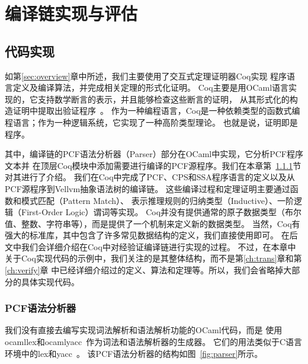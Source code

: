 
\chapter{编译链实现与评估} \label{ch:implement}

\setcounter{lstlisting}{1}
\section{代码实现}

如第\ref{sec:overview}章中所述，我们主要使用了交互式定理证明器Coq实现
程序语言定义及编译算法，并完成相关定理的形式化证明。
Coq主要是用OCaml语言实现的，它支持数学断言的表示，并且能够检查这些断言的证明，
从其形式化的构造证明中提取出验证程序~\cite{paulin2011introduction,chlipala2022certified}。
作为一种编程语言，Coq是一种依赖类型的函数式编程语言；作为一种逻辑系统，它实现了一种高阶类型理论。
也就是说，证明即是程序。

其中，编译链的PCF语法分析器（Parser）部分在OCaml中实现，它分析PCF程序文本并
在顶层Coq模块中添加需要进行编译的PCF源程序。我们在本章第~\ref{sec:pcfparser}节对其进行了介绍。
我们在Coq中完成了PCF、CPS和SSA程序语言的定义以及从PCF源程序到Vellvm抽象语法树的编译链。
这些编译过程和定理证明主要通过函数和模式匹配（Pattern Match）、
表示推理规则的归纳类型（Inductive）、一阶逻辑（First-Order Logic）谓词等实现。
Coq并没有提供通常的原子数据类型（布尔值、整数、字符串等），而是提供了一个机制来定义新的数据类型。
当然，Coq有强大的标准库，其中包含了许多常见数据结构的定义，我们直接使用即可。
在后文中我们会详细介绍在Coq中对经验证编译链进行实现的过程。
不过，在本章中关于Coq实现代码的示例中，我们关注的是其整体结构，而不是第\ref{ch:trans}章和第\ref{ch:verify}章
中已经详细介绍过的定义、算法和定理等。所以，我们会省略掉大部分的具体实现代码。

\subsection{PCF语法分析器} \label{sec:pcfparser}
我们没有直接去编写实现词法解析和语法解析功能的OCaml代码，而是
使用ocamllex和ocamlyacc~\cite{smith2007ocamllex}作为词法和语法解析器的生成器。
它们的用法类似于C语言环境中的lex和yacc~\cite{levine1992lex}。
该PCF语法分析器的结构如图~\ref{fig:parser}所示。

